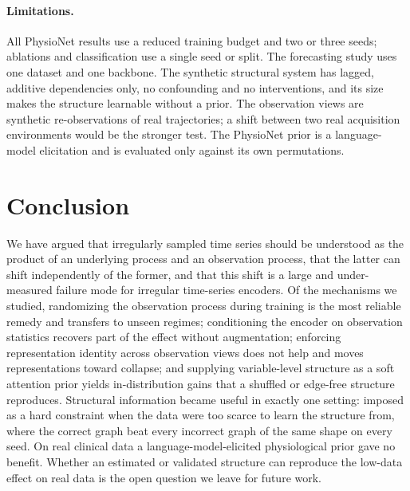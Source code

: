 \documentclass[sigconf,nonacm]{acmart}
\begin{document}
\paragraph{Limitations.}
All PhysioNet results use a reduced training budget and two or three seeds; ablations and classification use a
single seed or split. The forecasting study uses one dataset and one backbone. The synthetic structural system has
lagged, additive dependencies only, no confounding and no interventions, and its size makes the structure
learnable without a prior. The observation views are synthetic re-observations of real trajectories; a shift
between two real acquisition environments would be the stronger test. The PhysioNet prior is a language-model
elicitation and is evaluated only against its own permutations.

\section{Conclusion}
We have argued that irregularly sampled time series should be understood as the product of an underlying process
and an observation process, that the latter can shift independently of the former, and that this shift is a large
and under-measured failure mode for irregular time-series encoders. Of the mechanisms we studied, randomizing the
observation process during training is the most reliable remedy and transfers to unseen regimes; conditioning the
encoder on observation statistics recovers part of the effect without augmentation; enforcing representation
identity across observation views does not help and moves representations toward collapse; and supplying
variable-level structure as a soft attention prior yields in-distribution gains that a shuffled or edge-free
structure reproduces. Structural information became useful in exactly one setting: imposed as a hard constraint
when the data were too scarce to learn the structure from, where the correct graph beat every incorrect graph
of the same shape on every seed. On real clinical data a language-model-elicited physiological prior gave no
benefit. Whether an estimated or validated structure can reproduce the low-data effect on real data is the open
question we leave for future work.



\end{document}
